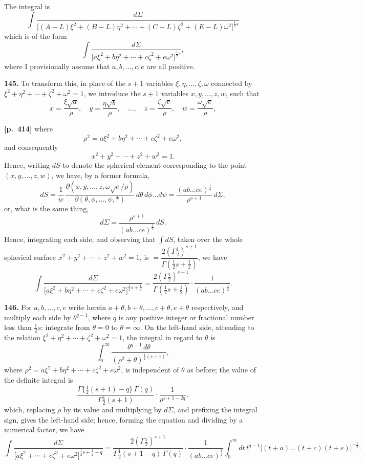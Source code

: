 \documentclass[11pt,a4paper]{article}
\begin{document}
The integral is
\[
\int \frac{d\Sigma}{\bigl[(A-L)\xi^{2} + (B-L)\eta^{2} + \cdots + (C-L)\zeta^{2} + (E-L)\omega^{2}\bigr]^{\tfrac{1}{2}s}}
\]
which is of the form
\[
\int \frac{d\Sigma}{\bigl[a\xi^{2} + b\eta^{2} + \cdots + c\zeta^{2} + e\omega^{2}\bigr]^{\tfrac{1}{2}s}},
\]
where I provisionally assume that $a,b,\ldots,c,e$ are all positive.

\textbf{145.} To transform this, in place of the $s+1$ variables $\xi,\eta,\ldots,\zeta,\omega$ connected by $\xi^{2}+\eta^{2}+\cdots+\zeta^{2}+\omega^{2} = 1$, we introduce the $s+1$ variables $x,y,\ldots,z,w$, such that
\[
x = \frac{\xi\sqrt{a}}{\rho},\quad y = \frac{\eta\sqrt{b}}{\rho},\quad \ldots,\quad z = \frac{\zeta\sqrt{c}}{\rho},\quad w = \frac{\omega\sqrt{e}}{\rho},
\]

\bigskip
\noindent\textbf{[p.~414]}\quad
where
\[
\rho^{2} = a\xi^{2} + b\eta^{2} + \cdots + c\zeta^{2} + e\omega^{2},
\]
and consequently
\[
x^{2}+y^{2}+\cdots+z^{2}+w^{2} = 1.
\]
Hence, writing $dS$ to denote the spherical element corresponding to the point $(x,y,\ldots,z,w)$, we have, by a former formula,
\[
dS = \frac{1}{w}\,\frac{\partial(x,y,\ldots,z,\omega\sqrt{e}/\rho)}{\partial(\theta,\phi,\ldots,\psi,*)}\,d\theta\,d\phi\ldots d\psi
= \frac{(ab\ldots ce)^{\tfrac{1}{2}}}{\rho^{s+1}}\,d\Sigma,
\]
or, what is the same thing,
\[
d\Sigma = \frac{\rho^{s+1}}{(ab\ldots ce)^{\tfrac{1}{2}}}\,dS.
\]
Hence, integrating each side, and observing that $\int dS$, taken over the whole spherical surface $x^{2}+y^{2}+\cdots+z^{2}+w^{2} = 1$, is $= \dfrac{2(\Gamma\tfrac{1}{2})^{s+1}}{\Gamma(\tfrac{1}{2}s+\tfrac{1}{2})}$, we have
\[
\int \frac{d\Sigma}{\bigl[a\xi^{2}+b\eta^{2}+\cdots+c\zeta^{2}+e\omega^{2}\bigr]^{\tfrac{1}{2}s+\tfrac{1}{2}}} = \frac{2(\Gamma\tfrac{1}{2})^{s+1}}{\Gamma(\tfrac{1}{2}s+\tfrac{1}{2})}\cdot\frac{1}{(ab\ldots ce)^{\tfrac{1}{2}}}.
\]

\textbf{146.} For $a,b,\ldots,c,e$ write herein $a+\theta,b+\theta,\ldots,c+\theta,e+\theta$ respectively, and multiply each side by $\theta^{q-1}$, where $q$ is any positive integer or fractional number less than $\tfrac{1}{2}s$: integrate from $\theta = 0$ to $\theta = \infty$. On the left-hand side, attending to the relation $\xi^{2}+\eta^{2}+\cdots+\zeta^{2}+\omega^{2} = 1$, the integral in regard to $\theta$ is
\[
\int_{0}^{\infty} \frac{\theta^{q-1}\,d\theta}{(\rho^{2}+\theta)^{\tfrac{1}{2}(s+1)}},
\]
where $\rho^{2} = a\xi^{2} + b\eta^{2} + \cdots + c\zeta^{2} + e\omega^{2}$, is independent of $\theta$ as before; the value of the definite integral is
\[
\frac{\Gamma\{\tfrac{1}{2}(s+1) - q\}\,\Gamma(q)}{\Gamma\tfrac{1}{2}(s+1)}\cdot\frac{1}{\rho^{s+1-2q}},
\]
which, replacing $\rho$ by its value and multiplying by $d\Sigma$, and prefixing the integral sign, gives the left-hand side; hence, forming the equation and dividing by a numerical factor, we have
\[
\int \frac{d\Sigma}{\bigl[a\xi^{2}+\cdots+c\zeta^{2}+e\omega^{2}\bigr]^{\tfrac{1}{2}s+\tfrac{1}{2}-q}} = \frac{2(\Gamma\tfrac{1}{2})^{s+1}}{\Gamma\tfrac{1}{2}(s+1-q)\,\Gamma(q)}\cdot\frac{1}{(ab\ldots ce)^{\tfrac{1}{2}}}\int_{0}^{\infty} dt\,t^{q-1}\bigl[(t+a)\ldots(t+c)(t+e)\bigr]^{-\tfrac{1}{2}}.
\]
\end{document}
